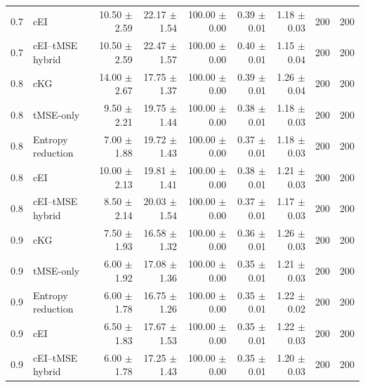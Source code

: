 \begin{tabular}{@{}clrrrrrrr@{}}
0.7 & cEI & 10.50 $\pm$ 2.59 & 22.17 $\pm$ 1.54 & 100.00 $\pm$ 0.00 & 0.39 $\pm$ 0.01 & 1.18 $\pm$ 0.03 & 200 & 200 \\
0.7 & cEI--tMSE hybrid & 10.50 $\pm$ 2.59 & 22.47 $\pm$ 1.57 & 100.00 $\pm$ 0.00 & 0.40 $\pm$ 0.01 & 1.15 $\pm$ 0.04 & 200 & 200 \\
0.8 & cKG & 14.00 $\pm$ 2.67 & 17.75 $\pm$ 1.37 & 100.00 $\pm$ 0.00 & 0.39 $\pm$ 0.01 & 1.26 $\pm$ 0.04 & 200 & 200 \\
0.8 & tMSE-only & 9.50 $\pm$ 2.21 & 19.75 $\pm$ 1.44 & 100.00 $\pm$ 0.00 & 0.38 $\pm$ 0.01 & 1.18 $\pm$ 0.03 & 200 & 200 \\
0.8 & Entropy reduction & 7.00 $\pm$ 1.88 & 19.72 $\pm$ 1.43 & 100.00 $\pm$ 0.00 & 0.37 $\pm$ 0.01 & 1.18 $\pm$ 0.03 & 200 & 200 \\
0.8 & cEI & 10.00 $\pm$ 2.13 & 19.81 $\pm$ 1.41 & 100.00 $\pm$ 0.00 & 0.38 $\pm$ 0.01 & 1.21 $\pm$ 0.03 & 200 & 200 \\
0.8 & cEI--tMSE hybrid & 8.50 $\pm$ 2.14 & 20.03 $\pm$ 1.54 & 100.00 $\pm$ 0.00 & 0.37 $\pm$ 0.01 & 1.17 $\pm$ 0.03 & 200 & 200 \\
0.9 & cKG & 7.50 $\pm$ 1.93 & 16.58 $\pm$ 1.32 & 100.00 $\pm$ 0.00 & 0.36 $\pm$ 0.01 & 1.26 $\pm$ 0.03 & 200 & 200 \\
0.9 & tMSE-only & 6.00 $\pm$ 1.92 & 17.08 $\pm$ 1.36 & 100.00 $\pm$ 0.00 & 0.35 $\pm$ 0.01 & 1.21 $\pm$ 0.03 & 200 & 200 \\
0.9 & Entropy reduction & 6.00 $\pm$ 1.78 & 16.75 $\pm$ 1.26 & 100.00 $\pm$ 0.00 & 0.35 $\pm$ 0.01 & 1.22 $\pm$ 0.02 & 200 & 200 \\
0.9 & cEI & 6.50 $\pm$ 1.83 & 17.67 $\pm$ 1.53 & 100.00 $\pm$ 0.00 & 0.35 $\pm$ 0.01 & 1.22 $\pm$ 0.03 & 200 & 200 \\
0.9 & cEI--tMSE hybrid & 6.00 $\pm$ 1.78 & 17.25 $\pm$ 1.43 & 100.00 $\pm$ 0.00 & 0.35 $\pm$ 0.01 & 1.20 $\pm$ 0.03 & 200 & 200 \\
\bottomrule
\end{tabular}
\smallskip

